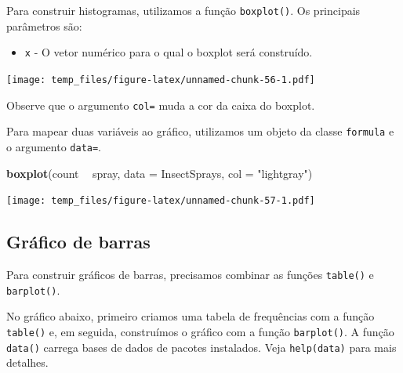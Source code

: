 \documentclass[]{book}
\newenvironment{Shaded}{\begin{snugshade}}{\end{snugshade}}
\newcommand{\CommentTok}[1]{\textcolor[rgb]{0.56,0.35,0.01}{\textit{#1}}}
\newcommand{\DataTypeTok}[1]{\textcolor[rgb]{0.13,0.29,0.53}{#1}}
\newcommand{\KeywordTok}[1]{\textcolor[rgb]{0.13,0.29,0.53}{\textbf{#1}}}
\newcommand{\NormalTok}[1]{#1}
\newcommand{\OperatorTok}[1]{\textcolor[rgb]{0.81,0.36,0.00}{\textbf{#1}}}
\newcommand{\StringTok}[1]{\textcolor[rgb]{0.31,0.60,0.02}{#1}}
\providecommand{\tightlist}{%
  \setlength{\itemsep}{0pt}\setlength{\parskip}{0pt}}
\begin{document}
Para construir histogramas, utilizamos a função \texttt{boxplot()}. Os principais parâmetros são:

\begin{itemize}
\tightlist
\item
  \texttt{x} - O vetor numérico para o qual o boxplot será construído.
\end{itemize}

\begin{Shaded}
\end{Shaded}

\texttt{[image: temp\_files/figure-latex/unnamed-chunk-56-1.pdf]}

Observe que o argumento \texttt{col=} muda a cor da caixa do boxplot.

Para mapear duas variáveis ao gráfico, utilizamos um objeto da classe \texttt{formula} e o argumento \texttt{data=}.

\begin{Shaded}
\begin{Highlighting}[]
\KeywordTok{boxplot}\NormalTok{(count }\OperatorTok{~}\StringTok{ }\NormalTok{spray, }\DataTypeTok{data =}\NormalTok{ InsectSprays, }\DataTypeTok{col =} \StringTok{"lightgray"}\NormalTok{)}
\end{Highlighting}
\end{Shaded}

\texttt{[image: temp\_files/figure-latex/unnamed-chunk-57-1.pdf]}

\hypertarget{gruxe1fico-de-barras}{%
\subsection{Gráfico de barras}\label{gruxe1fico-de-barras}}

Para construir gráficos de barras, precisamos combinar as funções \texttt{table()} e \texttt{barplot()}.

No gráfico abaixo, primeiro criamos uma tabela de frequências com a função \texttt{table()} e, em seguida, construímos o gráfico com a função \texttt{barplot()}. A função \texttt{data()} carrega bases de dados de pacotes instalados. Veja \texttt{help(data)} para mais detalhes.

\begin{Shaded}
\end{Shaded}
\end{document}
